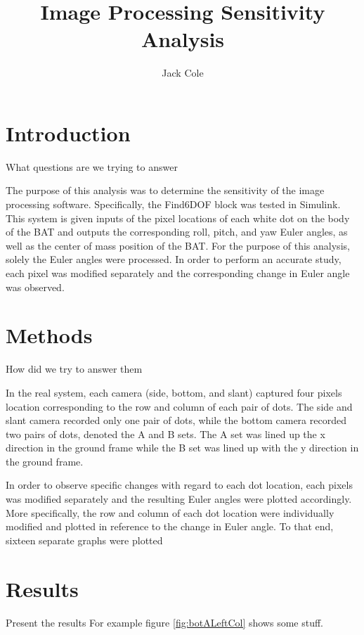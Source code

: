 \documentclass[12pt]{article}
\title{Image Processing Sensitivity Analysis}
\author{Jack Cole}
\date{}
\begin{document}
	
\maketitle

\begin{multicols}{2}
	
\section{Introduction}

What questions are we trying to answer

The purpose of this analysis was to determine the sensitivity of the image processing software. Specifically, the Find6DOF block was tested in Simulink. This system is given inputs of the pixel locations of each white dot on the body of the BAT and outputs the corresponding roll, pitch, and yaw Euler angles, as well as the center of mass position of the BAT. For the purpose of this analysis, solely the Euler angles were processed. In order to perform an accurate study, each pixel was modified separately and the corresponding change in Euler angle was observed.

\section{Methods}

How did we try to answer them

In the real system, each camera (side, bottom, and slant) captured four pixels location corresponding to the row and column of each pair of dots. The side and slant camera recorded only one pair of dots, while the bottom camera recorded two pairs of dots, denoted the A and B sets. The A set was lined up the x direction in the ground frame while the B set was lined up with the y direction in the ground frame.

In order to observe specific changes with regard to each dot location, each pixels was modified separately and the resulting Euler angles were plotted accordingly. More specifically, the row and column of each dot location were individually modified and plotted in reference to the change in Euler angle. To that end, sixteen separate graphs were plotted   

\section{Results}

Present the results
For example figure \ref{fig:botALeftCol} shows some stuff.


\end{multicols}
\end{document}
